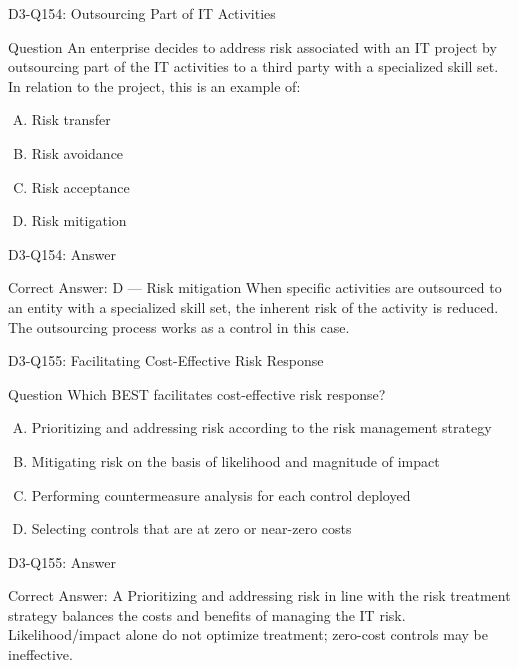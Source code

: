 \documentclass{beamer}
\begin{document}
	\begin{frame}{D3-Q154: Outsourcing Part of IT Activities}
		\begin{block}{Question}
			An enterprise decides to address risk associated with an IT project by outsourcing part of the IT activities to a third party with a specialized skill set. In relation to the project, this is an example of:
		\end{block}
		\begin{enumerate}[(A)]
			\item Risk transfer
			\item Risk avoidance
			\item Risk acceptance
			\item Risk mitigation
		\end{enumerate}
	\end{frame}
	\begin{frame}{D3-Q154: Answer}
		\begin{block}{Correct Answer: D --- Risk mitigation}
			When specific activities are outsourced to an entity with a specialized skill set, the inherent risk of the activity is reduced. The outsourcing process works as a control in this case.
		\end{block}
	\end{frame}
	
	\begin{frame}{D3-Q155: Facilitating Cost-Effective Risk Response}
		\begin{block}{Question}
			Which BEST facilitates cost-effective risk response?
		\end{block}
		\begin{enumerate}[(A)]
			\item Prioritizing and addressing risk according to the risk management strategy
			\item Mitigating risk on the basis of likelihood and magnitude of impact
			\item Performing countermeasure analysis for each control deployed
			\item Selecting controls that are at zero or near-zero costs
		\end{enumerate}
	\end{frame}
	\begin{frame}{D3-Q155: Answer}
		\begin{block}{Correct Answer: A}
			Prioritizing and addressing risk in line with the risk treatment strategy balances the costs and benefits of managing the IT risk. Likelihood/impact alone do not optimize treatment; zero-cost controls may be ineffective.
		\end{block}
	\end{frame}
	
\end{document}
